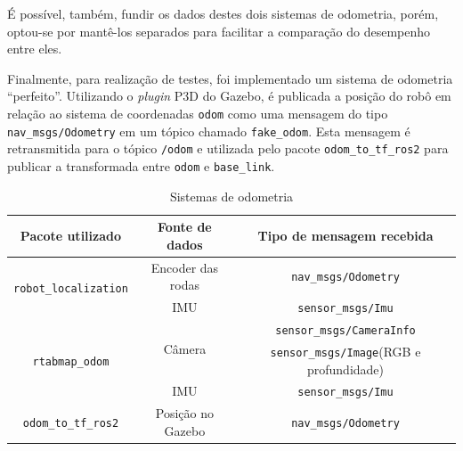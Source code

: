 \documentclass[repeatfields,xlists,xpacks,oneside,yearsonly]{ufrgscca}
\begin{document}
É possível, também, fundir os dados destes dois sistemas de odometria,
porém, optou-se por mantê-los separados para facilitar a comparação
do desempenho entre eles.

Finalmente, para realização de testes, foi implementado um sistema de odometria
“perfeito”.
Utilizando o \textit{plugin} P3D do Gazebo, é publicada a posição
do robô em relação ao sistema de coordenadas \texttt{odom} como uma mensagem
do tipo \texttt{nav\_msgs/Odometry} em um tópico chamado \texttt{fake\_odom}.
Esta mensagem é retransmitida para o tópico \texttt{/odom} e utilizada pelo
pacote \texttt{odom\_to\_tf\_ros2} para publicar a transformada entre
\texttt{odom} e \texttt{base\_link}.


\begin{table}[h]
    \begin{center}
        \caption{Sistemas de odometria}
        \label{tab:odometria}
        \begin{tabular}{c|c|c}
            Pacote utilizado                              & Fonte de dados          & Tipo de mensagem recebida                       \\
            \hline
            \multirow{2}{*}{\texttt{robot\_localization}} & Encoder das rodas       & \texttt{nav\_msgs/Odometry}                     \\
                                                          & IMU                     & \texttt{sensor\_msgs/Imu}                       \\
            \hline
            \multirow{3}{*}{\texttt{rtabmap\_odom}}       & \multirow{2}{*}{Câmera} & \texttt{sensor\_msgs/CameraInfo}                \\
                                                          &                         & \texttt{sensor\_msgs/Image}(RGB e profundidade) \\
                                                          & IMU                     & \texttt{sensor\_msgs/Imu}                       \\
            \hline
            \texttt{odom\_to\_tf\_ros2}                   & Posição no Gazebo       & \texttt{nav\_msgs/Odometry}                     \\
        \end{tabular}
    \end{center}
\end{table}
\end{document}
